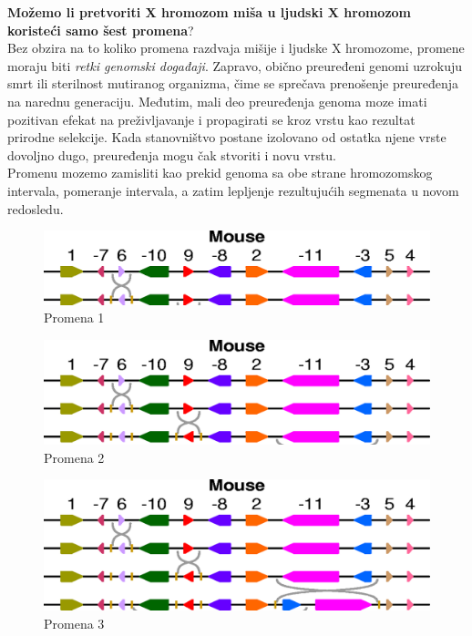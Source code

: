 \noindent \textbf{Možemo  li pretvoriti X hromozom miša u ljudski X hromozom koristeći samo šest promena}?\\

Bez obzira na to koliko promena razdvaja mišije i ljudske X hromozome, promene moraju biti \textit{retki genomski događaji}. Zapravo, obično preuređeni genomi uzrokuju smrt ili sterilnost mutiranog organizma, čime se sprečava prenošenje preuređenja na narednu generaciju. Međutim, mali deo preuređenja genoma moze imati pozitivan efekat na preživljavanje i propagirati se kroz vrstu kao rezultat prirodne selekcije. Kada stanovništvo postane izolovano od ostatka njene vrste dovoljno dugo, preuređenja mogu čak stvoriti i novu vrstu.\\

Promenu mozemo zamisliti kao prekid genoma sa obe strane hromozomskog intervala, pomeranje intervala, a zatim lepljenje rezultujućih segmenata u novom redosledu.\\

\begin{figure}[h!]
\centering
\includegraphics[scale=0.32]{poglavlja/6/slike/niz1.png}
\caption{Promena 1}
\label{slika:X}
\end{figure}

\begin{figure}[h!]
\centering
\includegraphics[scale=0.32]{poglavlja/6/slike/niz2.png}
\caption{Promena 2}
\label{slika:X}
\end{figure}

\begin{figure}[h!]
\centering
\includegraphics[scale=0.32]{poglavlja/6/slike/niz3.png}
\caption{Promena 3}
\label{slika:X}
\end{figure}

